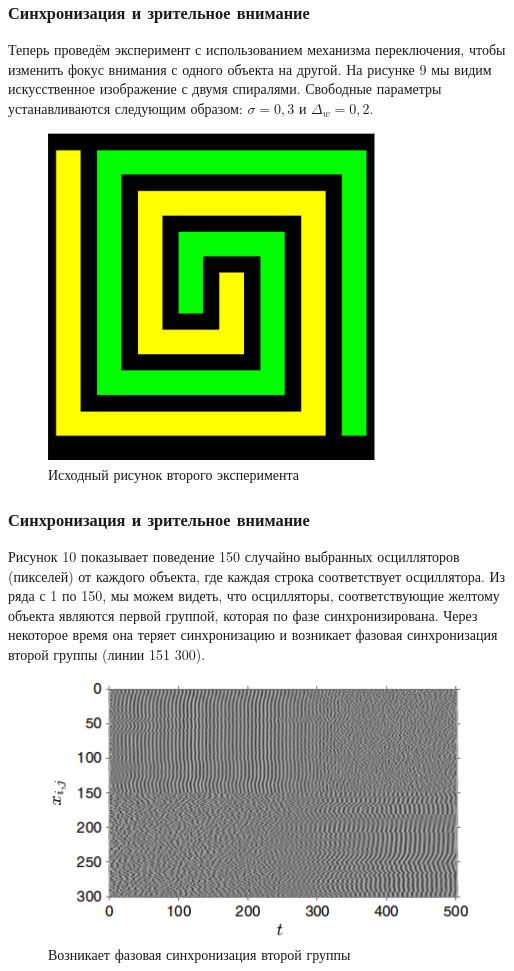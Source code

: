 \documentclass{beamer}
\begin{document}

\begin{frame}
\frametitle{Синхронизация и зрительное внимание}

Теперь проведём эксперимент с использованием механизма переключения, чтобы изменить фокус внимания с одного объекта на другой.
На рисунке 9 мы видим искусственное изображение с двумя спиралями. Свободные параметры устанавливаются следующим образом: $\sigma = 0,3$ и $\Delta_w = 0,2$.

\begin{figure}
\includegraphics[scale=0.35]{img/9}
\caption{Исходный рисунок второго эксперимента}
\end{figure}

\end{frame}


\begin{frame}
\frametitle{Синхронизация и зрительное внимание}

Рисунок 10 показывает поведение 150 случайно выбранных осцилляторов (пикселей) от каждого объекта, где каждая строка соответствует осциллятора. Из ряда с 1 по 150, мы можем видеть, что осцилляторы, соответствующие желтому объекта являются первой группой, которая по фазе синхронизирована. Через некоторое время она теряет синхронизацию и возникает фазовая синхронизация второй группы (линии 151 300).

\begin{figure}
\includegraphics[scale=0.35]{img/10}
\caption{Возникает фазовая синхронизация второй группы}
\end{figure}

\end{frame}
\end{document}
